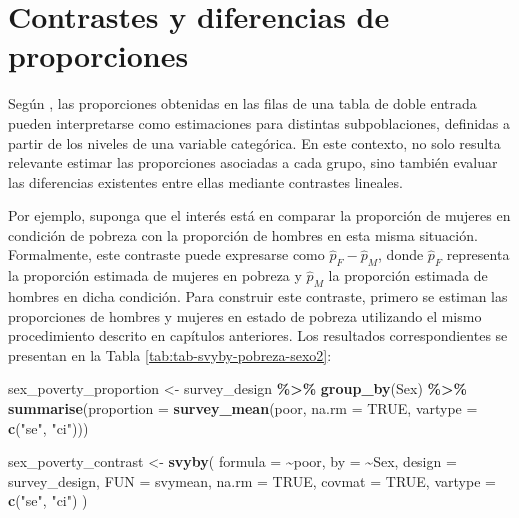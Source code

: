 \documentclass[
  spanish,
  12pt,
]{book}
\newenvironment{Shaded}{\begin{snugshade}}{\end{snugshade}}
\newcommand{\AttributeTok}[1]{\textcolor[rgb]{0.13,0.29,0.53}{#1}}
\newcommand{\ConstantTok}[1]{\textcolor[rgb]{0.56,0.35,0.01}{#1}}
\newcommand{\FunctionTok}[1]{\textcolor[rgb]{0.13,0.29,0.53}{\textbf{#1}}}
\newcommand{\NormalTok}[1]{#1}
\newcommand{\OtherTok}[1]{\textcolor[rgb]{0.56,0.35,0.01}{#1}}
\newcommand{\SpecialCharTok}[1]{\textcolor[rgb]{0.81,0.36,0.00}{\textbf{#1}}}
\newcommand{\StringTok}[1]{\textcolor[rgb]{0.31,0.60,0.02}{#1}}
\begin{document}
\section{Contrastes y diferencias de proporciones}\label{contrastes-y-diferencias-de-proporciones}

Según \citet{heeringa2017applied}, las proporciones obtenidas en las filas de una tabla de doble entrada pueden interpretarse como estimaciones para distintas subpoblaciones, definidas a partir de los niveles de una variable categórica. En este contexto, no solo resulta relevante estimar las proporciones asociadas a cada grupo, sino también evaluar las diferencias existentes entre ellas mediante contrastes lineales.

Por ejemplo, suponga que el interés está en comparar la proporción de mujeres en condición de pobreza con la proporción de hombres en esta misma situación. Formalmente, este contraste puede expresarse como \(\hat{p}_F - \hat{p}_M\), donde \(\hat{p}_F\) representa la proporción estimada de mujeres en pobreza y \(\hat{p}_M\) la proporción estimada de hombres en dicha condición. Para construir este contraste, primero se estiman las proporciones de hombres y mujeres en estado de pobreza utilizando el mismo procedimiento descrito en capítulos anteriores. Los resultados correspondientes se presentan en la Tabla \ref{tab:tab-svyby-pobreza-sexo2}:

\begin{Shaded}
\begin{Highlighting}[]
\NormalTok{sex\_poverty\_proportion }\OtherTok{\textless{}{-}}\NormalTok{ survey\_design }\SpecialCharTok{\%\textgreater{}\%}
  \FunctionTok{group\_by}\NormalTok{(Sex) }\SpecialCharTok{\%\textgreater{}\%}
  \FunctionTok{summarise}\NormalTok{(}\AttributeTok{proportion =} \FunctionTok{survey\_mean}\NormalTok{(poor,}
                                     \AttributeTok{na.rm =} \ConstantTok{TRUE}\NormalTok{,}
                                     \AttributeTok{vartype =} \FunctionTok{c}\NormalTok{(}\StringTok{"se"}\NormalTok{, }\StringTok{"ci"}\NormalTok{)))}

\NormalTok{sex\_poverty\_contrast }\OtherTok{\textless{}{-}} \FunctionTok{svyby}\NormalTok{(}
  \AttributeTok{formula =} \SpecialCharTok{\textasciitilde{}}\NormalTok{poor,}
  \AttributeTok{by =} \SpecialCharTok{\textasciitilde{}}\NormalTok{Sex,}
  \AttributeTok{design =}\NormalTok{ survey\_design,}
  \AttributeTok{FUN =}\NormalTok{ svymean,}
  \AttributeTok{na.rm =} \ConstantTok{TRUE}\NormalTok{,}
  \AttributeTok{covmat =} \ConstantTok{TRUE}\NormalTok{,}
  \AttributeTok{vartype =} \FunctionTok{c}\NormalTok{(}\StringTok{"se"}\NormalTok{, }\StringTok{"ci"}\NormalTok{)}
\NormalTok{)}
\end{Highlighting}
\end{Shaded}
\end{document}
